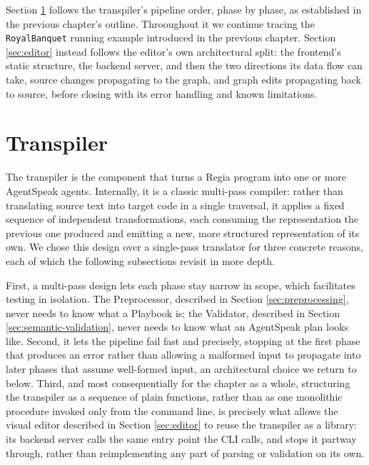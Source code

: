 Section \ref{sec:transpiler} follows the transpiler's pipeline order, phase by phase, as established in the previous chapter's outline. Throoughout it we continue tracing the \lstinline|RoyalBanquet| running example introduced in the previous chapter. Section \ref{sec:editor} instead follows the editor's own architectural split: the frontend's static structure, the backend server, and then the two directions its data flow can take, source changes propagating to the graph, and graph edits propagating back to source, before closing with its error handling and known limitations.


\section{Transpiler}
\label{sec:transpiler}
The transpiler is the component that turns a Regia program into one or more AgentSpeak agents. Internally, it is a classic multi-pass compiler: rather than translating source text into target code in a single traversal, it applies a fixed sequence of independent transformations, each consuming the representation the previous one produced and emitting a new, more structured representation of its own. We chose this design over a single-pass translator for three concrete reasons, each of which the following subsections revisit in more depth.


First, a multi-pass design lets each phase stay narrow in scope, which facilitates testing in isolation. The Preprocessor, described in Section \ref{sec:preprocessing}, never needs to know what a Playbook is; the Validator, described in Section \ref{sec:semantic-validation}, never needs to know what an AgentSpeak plan looks like. Second, it lets the pipeline fail fast and precisely, stopping at the first phase that produces an error rather than allowing a malformed input to propagate into later phases that assume well-formed input, an architectural choice we return to below. Third, and most consequentially for the chapter as a whole, structuring the transpiler as a sequence of plain functions, rather than as one monolithic procedure invoked only from the command line, is precisely what allows the visual editor described in Section \ref{sec:editor} to reuse the transpiler as a library: its backend server calls the same entry point the CLI calls, and stops it partway through, rather than reimplementing any part of parsing or validation on its own.

